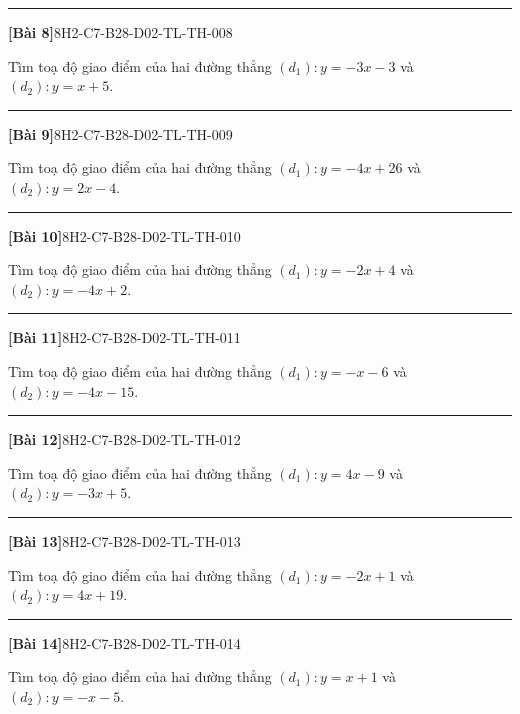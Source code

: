 \documentclass[12pt,a4paper]{article}
\newif\ifloigiai
\newenvironment{cauhoi}[2]{%
  \par\medskip\noindent\rule{\textwidth}{0.4pt}\par\nopagebreak
  \noindent\textbf{[#1]}\hfill{\scriptsize\ttfamily #2}\par\nopagebreak\smallskip}{\par}
\newcommand{\loigiai}[1]{\ifloigiai\par\smallskip\noindent\textit{Lời giải.} #1\par\fi}
\begin{document}
\begin{cauhoi}{Bài 8}{8H2-C7-B28-D02-TL-TH-008}
Tìm toạ độ giao điểm của hai đường thẳng $(d_1): y=-3x-3$ và $(d_2): y=x+5$.
\loigiai{Hoành độ giao điểm là nghiệm của phương trình $-3x-3=x+5$, suy ra $-4x=8$ nên $x=-2$. Thay vào $(d_1)$: $y=-3\cdot(-2)-3=3$. Vậy giao điểm là $(-2;3)$.}
\end{cauhoi}
\begin{cauhoi}{Bài 9}{8H2-C7-B28-D02-TL-TH-009}
Tìm toạ độ giao điểm của hai đường thẳng $(d_1): y=-4x+26$ và $(d_2): y=2x-4$.
\loigiai{Hoành độ giao điểm là nghiệm của phương trình $-4x+26=2x-4$, suy ra $-6x=-30$ nên $x=5$. Thay vào $(d_1)$: $y=-4\cdot(5)+26=6$. Vậy giao điểm là $(5;6)$.}
\end{cauhoi}
\begin{cauhoi}{Bài 10}{8H2-C7-B28-D02-TL-TH-010}
Tìm toạ độ giao điểm của hai đường thẳng $(d_1): y=-2x+4$ và $(d_2): y=-4x+2$.
\loigiai{Hoành độ giao điểm là nghiệm của phương trình $-2x+4=-4x+2$, suy ra $2x=-2$ nên $x=-1$. Thay vào $(d_1)$: $y=-2\cdot(-1)+4=6$. Vậy giao điểm là $(-1;6)$.}
\end{cauhoi}
\begin{cauhoi}{Bài 11}{8H2-C7-B28-D02-TL-TH-011}
Tìm toạ độ giao điểm của hai đường thẳng $(d_1): y=-x-6$ và $(d_2): y=-4x-15$.
\loigiai{Hoành độ giao điểm là nghiệm của phương trình $-x-6=-4x-15$, suy ra $3x=-9$ nên $x=-3$. Thay vào $(d_1)$: $y=-1\cdot(-3)-6=-3$. Vậy giao điểm là $(-3;-3)$.}
\end{cauhoi}
\begin{cauhoi}{Bài 12}{8H2-C7-B28-D02-TL-TH-012}
Tìm toạ độ giao điểm của hai đường thẳng $(d_1): y=4x-9$ và $(d_2): y=-3x+5$.
\loigiai{Hoành độ giao điểm là nghiệm của phương trình $4x-9=-3x+5$, suy ra $7x=14$ nên $x=2$. Thay vào $(d_1)$: $y=4\cdot(2)-9=-1$. Vậy giao điểm là $(2;-1)$.}
\end{cauhoi}
\begin{cauhoi}{Bài 13}{8H2-C7-B28-D02-TL-TH-013}
Tìm toạ độ giao điểm của hai đường thẳng $(d_1): y=-2x+1$ và $(d_2): y=4x+19$.
\loigiai{Hoành độ giao điểm là nghiệm của phương trình $-2x+1=4x+19$, suy ra $-6x=18$ nên $x=-3$. Thay vào $(d_1)$: $y=-2\cdot(-3)+1=7$. Vậy giao điểm là $(-3;7)$.}
\end{cauhoi}
\begin{cauhoi}{Bài 14}{8H2-C7-B28-D02-TL-TH-014}
Tìm toạ độ giao điểm của hai đường thẳng $(d_1): y=x+1$ và $(d_2): y=-x-5$.
\loigiai{Hoành độ giao điểm là nghiệm của phương trình $x+1=-x-5$, suy ra $2x=-6$ nên $x=-3$. Thay vào $(d_1)$: $y=1\cdot(-3)+1=-2$. Vậy giao điểm là $(-3;-2)$.}
\end{cauhoi}
\end{document}
